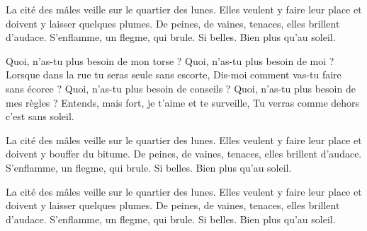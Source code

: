 La cité des mâles veille sur le quartier des lunes.
Elles veulent y faire leur place et doivent y laisser quelques plumes.
De peines, de vaines, tenaces, elles brillent d'audace.
S'enflamme, un flegme, qui brule. Si belles.
Bien plus qu'au soleil.

Quoi, n'as-tu plus besoin de mon torse ?
Quoi, n'as-tu plus besoin de moi ?
Lorsque dans la rue tu seras seule sans escorte,
Dis-moi comment vas-tu faire sans écorce ?
Quoi, n'as-tu plus besoin de conseils ?
Quoi, n'as-tu plus besoin de mes règles ?
Entends, mais fort, je t’aime et te surveille,
Tu verras comme dehors c’est sans soleil.


La cité des mâles veille sur le quartier des lunes.
Elles veulent y faire leur place et doivent y bouffer du bitume.
De peines, de vaines, tenaces, elles brillent d'audace.
S'enflamme, un flegme, qui brule. Si belles.
Bien plus qu'au soleil.

La cité des mâles veille sur le quartier des lunes.
Elles veulent y faire leur place et doivent y laisser quelques plumes.
De peines, de vaines, tenaces, elles brillent d'audace.
S'enflamme, un flegme, qui brule. Si belles.
Bien plus qu'au soleil.


